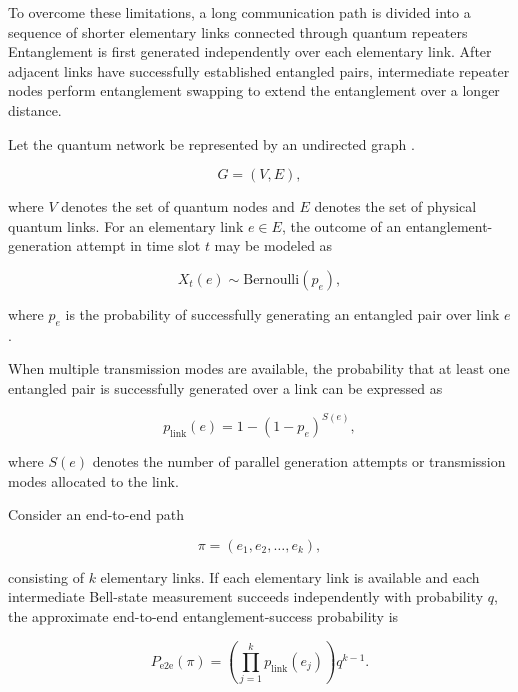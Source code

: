 To overcome these limitations, a long communication path is divided into a sequence of shorter elementary links connected through quantum repeaters \cite{briegel1998quantum,pant2019routing} Entanglement is first generated independently over each elementary link. After adjacent links have successfully established entangled pairs, intermediate repeater nodes perform entanglement swapping to extend the entanglement over a longer distance.

Let the quantum network be represented by an undirected graph \cite{pant2019routing,lee2022router,das2021adaptive,xu2023quantumnetwork,li2024adaptive}.

\begin{equation}
    G = (V,E),
\end{equation}

where $V$ denotes the set of quantum nodes and $E$ denotes the set of physical quantum links. For an elementary link $e \in E$, the outcome of an entanglement-generation attempt in time slot $t$ may be modeled as

\begin{equation}
    X_t(e) \sim \mathrm{Bernoulli}\left(p_e\right),
\end{equation}

where $p_e$ is the probability of successfully generating an entangled pair over link $e$.

When multiple transmission modes are available, the probability that at least one entangled pair is successfully generated over a link can be expressed as

\begin{equation}
    p_{\mathrm{link}}(e)
    =
    1-
    \left(
    1-p_e
    \right)^{S(e)},
\end{equation}

where $S(e)$ denotes the number of parallel generation attempts or transmission modes allocated to the link.

Consider an end-to-end path

\begin{equation}
    \pi =
    \left(
    e_1,e_2,\ldots,e_k
    \right),
\end{equation}

consisting of $k$ elementary links. If each elementary link is available and each intermediate Bell-state measurement succeeds independently with probability $q$, the approximate end-to-end entanglement-success probability is

\begin{equation}
    P_{\mathrm{e2e}}(\pi)
    =
    \left(
    \prod_{j=1}^{k}
    p_{\mathrm{link}}(e_j)
    \right)
    q^{k-1}.
\end{equation}

